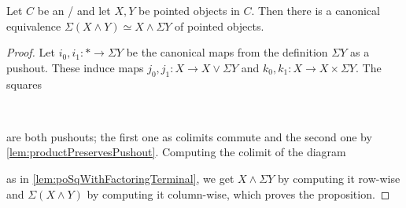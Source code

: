 \begin{lemma}\label{lem:suspensionCommutesWithSmash}
    Let $C$ be an \inftytop/ and let $X,Y$ be pointed objects in $C$. 
    Then there is a canonical equivalence $\Sigma\left(X\wedge Y\right)\simeq X\wedge\Sigma Y$ of pointed objects.
    \begin{proof}
        Let $i_0,i_1\colon *\to\Sigma Y$ be the canonical maps from the definition $\Sigma Y$ as a pushout.
        These induce maps $j_0,j_1\colon X \to X\vee\Sigma Y$ and $k_0,k_1\colon X\to X\times\Sigma Y$.
        The squares
        \begin{center}
            \
        \end{center}
        are both pushouts; the first one as colimits commute and the second one by \cref{lem:productPreservesPushout}.
        Computing the colimit of the diagram 
        \begin{center}
        \end{center}
        as in \cref{lem:poSqWithFactoringTerminal}, we get $X\wedge\Sigma Y$ by computing it row-wise and $\Sigma\left(X\wedge Y\right)$ by computing it column-wise, which proves the proposition.
    \end{proof}
\end{lemma}
